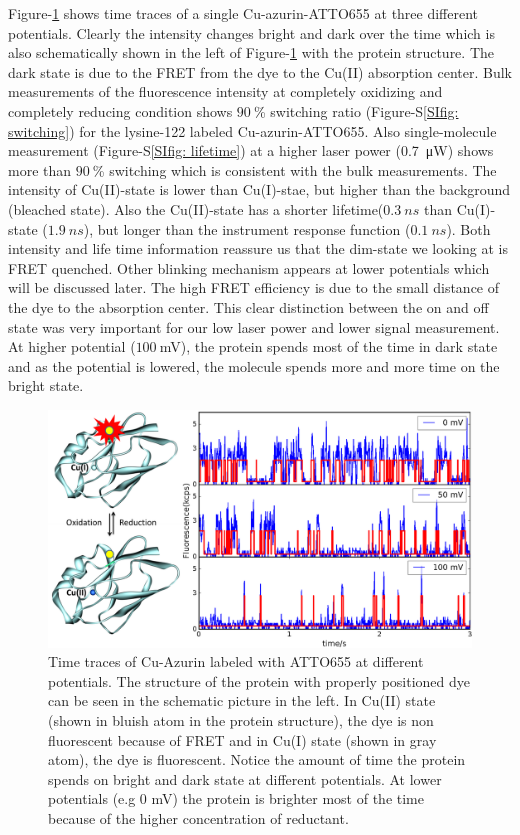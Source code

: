 \documentclass[journal=jacsat,manuscript=article]{achemso}
\begin{document}
Figure-\ref{fig:timetrace} shows time traces of a single Cu-azurin-ATTO655 at three different potentials. Clearly the intensity changes bright and dark over the time which is also schematically shown in the left of Figure-\ref{fig:timetrace} with the protein structure. The dark state is due to the FRET from the dye to the Cu(II) absorption center\cite{kuznetsova2006a}. Bulk measurements of the fluorescence intensity at completely oxidizing and completely reducing condition shows $90~$\% switching ratio (Figure-S\ref{SIfig: switching}) for the lysine-122\cite{nicolardi2012topdown} labeled Cu-azurin-ATTO655. Also single-molecule measurement (Figure-S\ref{SIfig: lifetime}) at a higher laser power (\SI{0.7}{\micro\watt}) shows more than $90~$\% switching which is consistent with the bulk measurements. The intensity of Cu(II)-state is lower than Cu(I)-stae, but higher than the background (bleached state). Also the Cu(II)-state has a shorter lifetime($0.3~ns$ than Cu(I)-state ($1.9~ns$), but longer than the instrument response function ($0.1~ns$). Both intensity and life time information reassure us that the dim-state we looking at is FRET quenched. Other blinking mechanism appears at lower potentials which will be discussed later. The high FRET efficiency is due to the small distance of the dye to the absorption center. This clear distinction between the on and off state was very important for our low laser power and lower signal measurement. At higher potential ($100~$mV), the protein spends most of the time in dark state and as the potential is lowered, the molecule spends more and more time on the bright state.
\begin{figure}
	\includegraphics[width=\textwidth]{Figure/Figure_1_timetrace_CuAzu.eps}
	\caption{Time traces of Cu-Azurin labeled with ATTO655 at different potentials. The structure of the protein with properly positioned dye can be seen in the schematic picture in the left. In Cu(II) state (shown in bluish atom in the protein structure), the dye is non fluorescent because of FRET and in Cu(I) state (shown in gray atom), the dye is fluorescent. Notice the amount of time the protein spends on bright and dark state at different potentials. At lower potentials (e.g 0 mV) the protein is brighter most of the time because of the higher concentration of reductant.}
	\label{fig:timetrace}
\end{figure}
\end{document}
